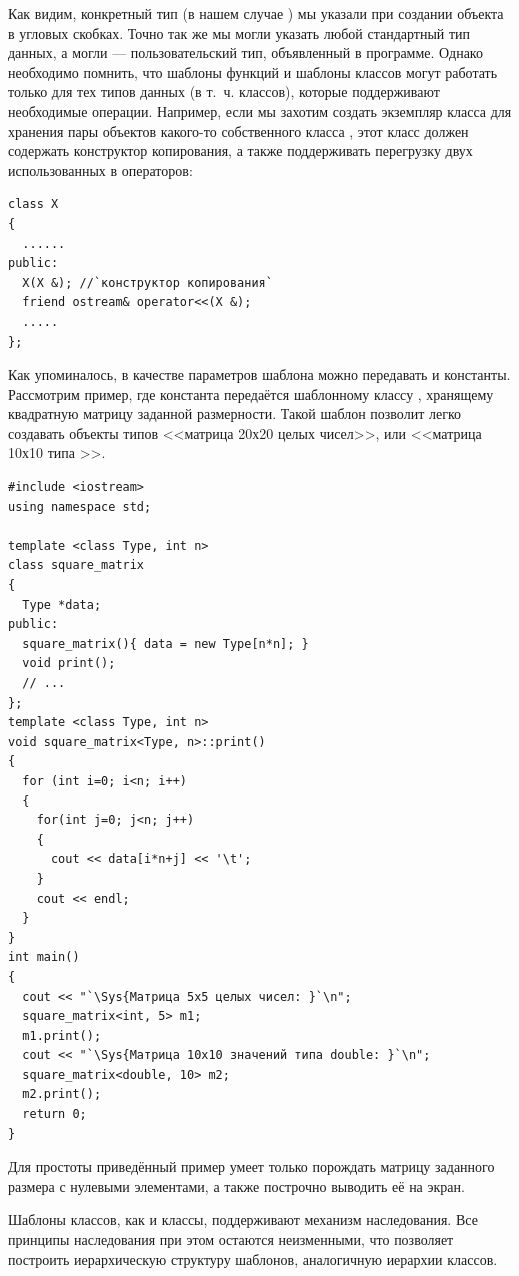 Как видим, конкретный тип (в нашем случае ) мы указали при создании объекта в угловых
скобках. Точно так же мы могли указать любой стандартный тип данных, а могли --- пользовательский тип, объявленный в
программе. Однако необходимо помнить, что шаблоны функций и шаблоны классов могут работать только для тех типов данных
(в т.~ч. классов), которые поддерживают необходимые операции. Например, если мы захотим создать экземпляр класса
 для хранения пары объектов какого-то собственного класса , этот
класс должен содержать конструктор копирования, а также поддерживать перегрузку двух использованных в
 операторов:
\begin{lstlisting}
class X 
{
  ......
public:
  X(X &); //`конструктор копирования`
  friend ostream& operator<<(X &);
  .....
};
\end{lstlisting}

Как упоминалось, в качестве параметров шаблона можно передавать и константы. Рассмотрим пример, где константа передаётся
шаблонному классу , хранящему квадратную матрицу заданной размерности. Такой шаблон
позволит легко создавать объекты типов <<матрица 20х20 целых чисел>>, или <<матрица 10х10 типа
>>.
\begin{lstlisting}
#include <iostream> 
using namespace std; 

template <class Type, int n> 
class square_matrix 
{ 
  Type *data; 
public: 
  square_matrix(){ data = new Type[n*n]; } 
  void print(); 
  // ... 
}; 
template <class Type, int n> 
void square_matrix<Type, n>::print() 
{ 
  for (int i=0; i<n; i++) 
  { 
    for(int j=0; j<n; j++) 
    { 
      cout << data[i*n+j] << '\t'; 
    } 
    cout << endl; 
  } 
} 
int main() 
{ 
  cout << "`\Sys{Матрица 5х5 целых чисел: }`\n"; 
  square_matrix<int, 5> m1; 
  m1.print(); 
  cout << "`\Sys{Матрица 10х10 значений типа double: }`\n"; 
  square_matrix<double, 10> m2; 
  m2.print(); 
  return 0; 
} 
\end{lstlisting}

Для простоты приведённый пример умеет только порождать матрицу заданного размера с нулевыми элементами, а также
построчно выводить её на экран.

Шаблоны классов, как и классы, поддерживают механизм наследования. Все принципы наследования при этом остаются
неизменными, что позволяет построить иерархическую структуру шаблонов, аналогичную иерархии классов.

